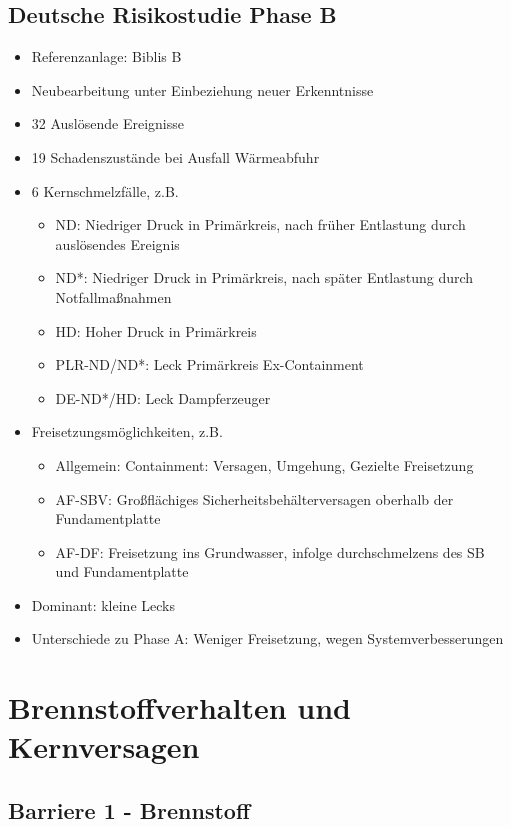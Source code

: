 \documentclass[12pt]{article}
\begin{document}
\subsection{Deutsche Risikostudie Phase B}
\begin{itemize}
	\item Referenzanlage: Biblis B
	\item Neubearbeitung unter Einbeziehung neuer Erkenntnisse
	\item 32 Auslösende Ereignisse
	\item 19 Schadenszustände bei Ausfall Wärmeabfuhr
	\item 6 Kernschmelzfälle, z.B.
		\begin{itemize}
			\item ND: Niedriger Druck in Primärkreis, nach früher Entlastung durch auslösendes Ereignis
			\item ND*: Niedriger Druck in Primärkreis, nach später Entlastung durch Notfallmaßnahmen
			\item HD: Hoher Druck in Primärkreis
			\item PLR-ND/ND*: Leck Primärkreis Ex-Containment
			\item DE-ND*/HD: Leck Dampferzeuger
		\end{itemize}
	\item Freisetzungsmöglichkeiten, z.B.
		\begin{itemize}
			\item Allgemein: Containment: Versagen, Umgehung, Gezielte Freisetzung
			\item AF-SBV: Großflächiges Sicherheitsbehälterversagen oberhalb der Fundamentplatte
			\item AF-DF: Freisetzung ins Grundwasser, infolge durchschmelzens des SB und Fundamentplatte
		\end{itemize}
	\item Dominant: kleine Lecks
	\item Unterschiede zu Phase A: Weniger Freisetzung, wegen Systemverbesserungen
\end{itemize}

\section{Brennstoffverhalten und Kernversagen}

\subsection{Barriere 1 - Brennstoff}
\end{document}
